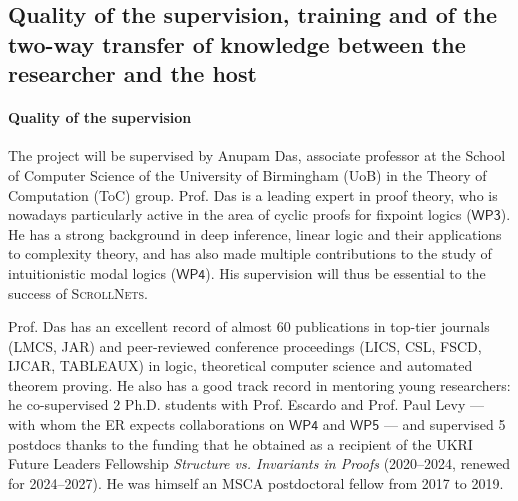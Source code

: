 \documentclass[11pt]{msca-pf}
\newcommand{\proj}{\small\textsc{ScrollNets}}
\newcommand{\WP}[1]{$\mathsf{WP#1}$}
\begin{document}



\subsection{Quality of the supervision, training and of the two-way transfer of
    knowledge between the researcher and the host}
\label{ssc:excellence:supervision}

\paragraph{Quality of the supervision}
The project will be supervised by Anupam Das, associate professor at the School of Computer Science
of the University of Birmingham (UoB) in the Theory of Computation (ToC) group. Prof. Das is a leading
expert in proof theory, who is nowadays particularly active in the area of cyclic proofs for
fixpoint logics (\WP{3}). He has a strong background in deep inference, linear logic and their
applications to complexity theory, and has also made multiple contributions to the study of
intuitionistic modal logics (\WP{4}). His supervision will thus be essential to the success of
{\proj}.

Prof. Das has an excellent record of almost 60 publications in top-tier journals (LMCS, JAR) and
peer-reviewed conference proceedings (LICS, CSL, FSCD, IJCAR, TABLEAUX) in logic, theoretical
computer science and automated theorem proving. He also has a good track record in mentoring young
researchers: he co-supervised 2 Ph.D. students with Prof. Escardo and Prof. Paul Levy --- with whom
the ER expects collaborations on \WP{4} and \WP{5} --- and supervised 5 postdocs thanks to the
funding that he obtained as a recipient of the UKRI Future Leaders Fellowship \textit{Structure vs.
Invariants in Proofs} (2020--2024, renewed for 2024--2027). He was himself an MSCA postdoctoral
fellow from 2017 to 2019.
\end{document}
